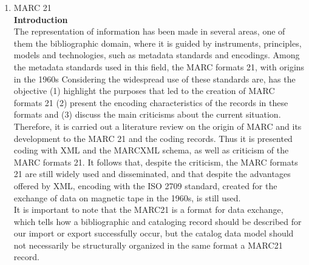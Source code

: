 \begin{enumerate}
	\item MARC 21\\
	{\bf Introduction}\\
	The representation of information has been made in several areas, one of them the bibliographic domain, where it is guided by instruments, principles, models and technologies, such as metadata standards and encodings. Among the metadata standards used in this field, the MARC formats 21, with origins in the 1960s Considering the widespread use of these standards are, has the objective (1) highlight the purposes that led to the creation of MARC formats 21 (2) present the encoding characteristics of the records in these formats and (3) discuss the main criticisms about the current situation. Therefore, it is carried out a literature review on the origin of MARC and its development to the MARC 21 and the coding records. Thus it is presented coding with XML and the MARCXML schema, as well as criticism of the MARC formats 21. It follows that, despite the criticism, the MARC formats 21 are still widely used and disseminated, and that despite the advantages offered by XML, encoding with the ISO 2709 standard, created for the exchange of data on magnetic tape in the 1960s, is still used. \\
	It is important to note that the MARC21 is a format for data exchange, which tells how a bibliographic and cataloging record should be described for our import or export successfully occur, but the catalog data model should not necessarily be structurally organized in the same format a MARC21 record.
	

\end{enumerate}
